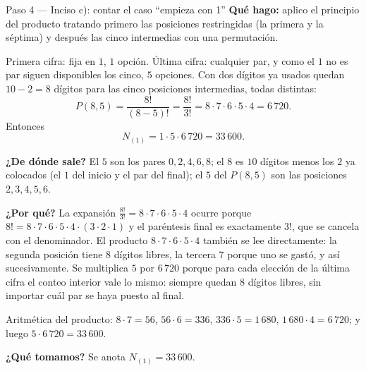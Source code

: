 \documentclass[11pt]{article}
\begin{document}
\begin{paso}{Paso 4 --- Inciso c): contar el caso ``empieza con 1''}
\textbf{Qué hago:} aplico el principio del producto tratando primero las posiciones restringidas (la primera y la séptima) y después las cinco intermedias con una permutación.

Primera cifra: fija en $1$, $1$ opción. Última cifra: cualquier par, y como el $1$ no es par siguen disponibles los cinco, $5$ opciones. Con dos dígitos ya usados quedan $10-2=8$ dígitos para las cinco posiciones intermedias, todas distintas:
\[
  P(8,5)=\frac{8!}{(8-5)!}=\frac{8!}{3!}=8\cdot 7\cdot 6\cdot 5\cdot 4 = 6\,720 .
\]
Entonces
\[
  N_{(1)} = 1\cdot 5\cdot 6\,720 = 33\,600 .
\]

\textbf{¿De dónde sale?} El $5$ son los pares $0,2,4,6,8$; el $8$ es $10$ dígitos menos los $2$ ya colocados (el $1$ del inicio y el par del final); el $5$ del $P(8,5)$ son las posiciones $2,3,4,5,6$.

\textbf{¿Por qué?} La expansión $\frac{8!}{3!}=8\cdot 7\cdot 6\cdot 5\cdot 4$ ocurre porque $8!=8\cdot 7\cdot 6\cdot 5\cdot 4\cdot(3\cdot 2\cdot 1)$ y el paréntesis final es exactamente $3!$, que se cancela con el denominador. El producto $8\cdot 7\cdot 6\cdot 5\cdot 4$ también se lee directamente: la segunda posición tiene $8$ dígitos libres, la tercera $7$ porque uno se gastó, y así sucesivamente. Se multiplica $5$ por $6\,720$ porque para cada elección de la última cifra el conteo interior vale lo mismo: siempre quedan $8$ dígitos libres, sin importar cuál par se haya puesto al final.

Aritmética del producto: $8\cdot 7=56$, $56\cdot 6=336$, $336\cdot 5=1\,680$, $1\,680\cdot 4=6\,720$; y luego $5\cdot 6\,720=33\,600$.

\textbf{¿Qué tomamos?} Se anota $N_{(1)}=33\,600$.
\end{paso}
\end{document}
